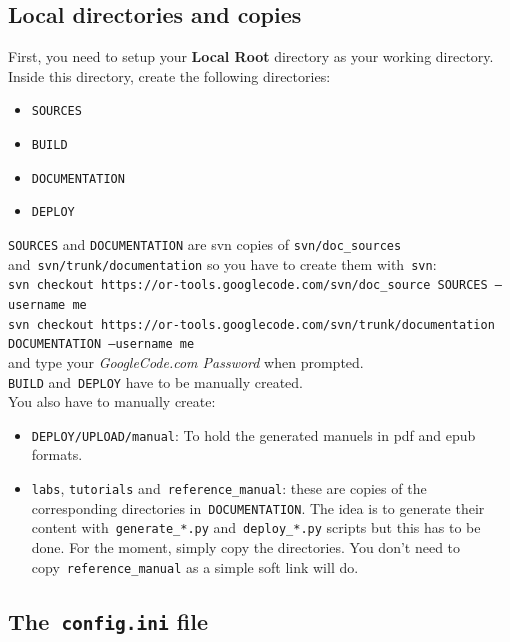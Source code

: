 \documentclass[a4paper,10pt]{article}
\newcommand{\code}[1]{\texttt{#1}}
\begin{document}
\subsection{Local directories and copies}

First, you need to setup your {\bf Local Root} directory as your working directory. Inside this directory, create the following directories:
\begin{itemize}
\item \code{SOURCES}
\item \code{BUILD}
\item \code{DOCUMENTATION}
\item \code{DEPLOY}
\end{itemize}

\code{SOURCES} and \code{DOCUMENTATION} are svn copies of \code{svn/doc\_sources} and~\code{svn/trunk/documentation} so you have to create them with~\code{svn}:\\

\code{svn checkout https://or-tools.googlecode.com/svn/doc\_source SOURCES --username me}\\

\code{svn checkout https://or-tools.googlecode.com/svn/trunk/documentation DOCUMENTATION --username me}\\

and type your \emph{GoogleCode.com Password} when prompted.\\

\code{BUILD} and~\code{DEPLOY} have to be manually created.\\

You also have to manually create:

\begin{itemize}
\item \code{DEPLOY/UPLOAD/manual}: To hold the generated manuels in pdf and epub formats.
\item \code{labs}, \code{tutorials} and~\code{reference\_manual}: these are copies of the corresponding directories in~\code{DOCUMENTATION}. The idea is to generate their content with~\code{generate\_*.py} and~\code{deploy\_*.py} scripts but this has to be done. For the moment, simply copy the directories. You don't need to copy~\code{reference\_manual} as a simple soft link will do.
\end{itemize}

\subsection{The~\code{config.ini} file}
\end{document}
